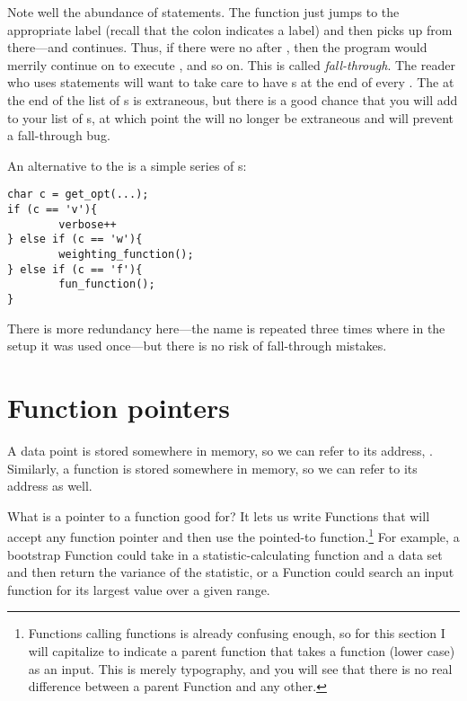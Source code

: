 Note well the abundance of  statements.  The 
function just jumps to the appropriate label (recall that the colon
indicates a label) and then picks up from there---and continues. Thus,
if there were no  after , then the program
would merrily continue on to execute , and so
on. This is called {\sl fall-through}. The
reader who uses  statements will want to take care
to have s at the end of every .  The 
at the end of the list of s is extraneous, but there is a good
chance that you will add to your list of s, at which point
the  will no longer be extraneous and will prevent a fall-through bug.

An alternative to the  is a simple series of s:
\begin{lstlisting}
char c = get_opt(...);
if (c == 'v'){
        verbose++
} else if (c == 'w'){
        weighting_function();
} else if (c == 'f'){
        fun_function();
}
\end{lstlisting}
There is more redundancy here---the name  is repeated three times
where in the  setup it was used once---but there is no risk
of fall-through mistakes.



\section{Function pointers} 
A data point  is stored somewhere in memory, so we can refer to
its address, . Similarly, a function  is stored somewhere
in memory, so we can refer to its address as well.

What is a pointer to a function good for?  It lets us write
Functions that will accept any function pointer and then use the
pointed-to function.\footnote{Functions calling functions is already
confusing enough, so for this section I will capitalize 
to indicate a parent function that takes a function (lower case) as an
input. This is merely typography, and you will see that there is no real
difference between a parent Function and any other.} For example, a
bootstrap Function could take in a statistic-calculating function and
a data set and then return the variance of the statistic, or a Function
could search an input function for its largest value over a given range.

